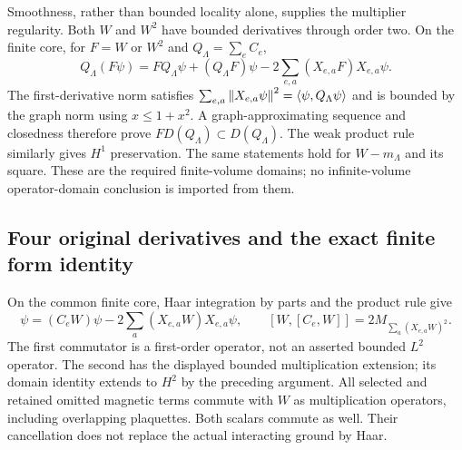 Smoothness, rather than bounded locality alone, supplies the multiplier regularity. Both $W$ and $W^2$ have bounded derivatives through order two. On the finite core, for $F=W$ or $W^2$ and $Q_\Lambda=\sum_eC_e$,
\begin{equation}
 Q_\Lambda(F\psi)=FQ_\Lambda\psi+(Q_\Lambda F)\psi
             -2\sum_{e,a}(X_{e,a}F)X_{e,a}\psi.
 \label{eq:ak2-leibniz}
\end{equation}
The first-derivative norm satisfies $\sum_{e,a}\left\lVert X_{e,a}\psi\right\rVert^2=\langle\psi,Q_\Lambda\psi\rangle$ and is bounded by the graph norm using $x\le1+x^2$. A graph-approximating sequence and closedness therefore prove $F D(Q_\Lambda)\subset D(Q_\Lambda)$. The weak product rule similarly gives $H^1$ preservation. The same statements hold for $W-m_\Lambda$ and its square. These are the required finite-volume domains; no infinite-volume operator-domain conclusion is imported from them.

\subsection{Four original derivatives and the exact finite form identity}
On the common finite core, Haar integration by parts and the product rule give
\begin{equation}
 [C_e,W]\psi=(C_eW)\psi-2\sum_a(X_{e,a}W)X_{e,a}\psi,
 \qquad[W,[C_e,W]]=2M_{\sum_a(X_{e,a}W)^2}.
 \label{eq:ak2-double}
\end{equation}
The first commutator is a first-order operator, not an asserted bounded $L^2$ operator. The second has the displayed bounded multiplication extension; its domain identity extends to $H^2$ by the preceding argument. All selected and retained omitted magnetic terms commute with $W$ as multiplication operators, including overlapping plaquettes. Both scalars commute as well. Their cancellation does not replace the actual interacting ground by Haar.

